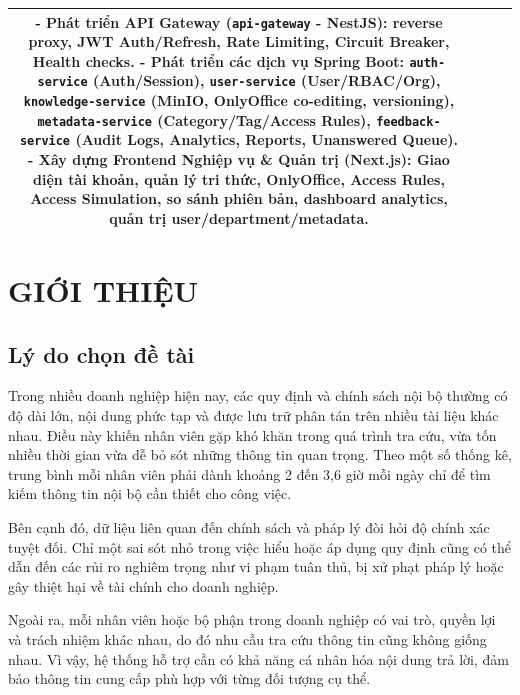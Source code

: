 \documentclass[12pt,a4paper]{report}
\begin{document}
\begin{table}[H]
\begin{tabularx}{\textwidth}{|c|l|l|X|}
- Phát triển API Gateway (\texttt{api-gateway} - NestJS): reverse proxy, JWT Auth/Refresh, Rate Limiting, Circuit Breaker, Health checks. \newline
- Phát triển các dịch vụ Spring Boot: \texttt{auth-service} (Auth/Session), \texttt{user-service} (User/RBAC/Org), \texttt{knowledge-service} (MinIO, OnlyOffice co-editing, versioning), \texttt{metadata-service} (Category/Tag/Access Rules), \texttt{feedback-service} (Audit Logs, Analytics, Reports, Unanswered Queue). \newline
- Xây dựng Frontend Nghiệp vụ \& Quản trị (Next.js): Giao diện tài khoản, quản lý tri thức, OnlyOffice, Access Rules, Access Simulation, so sánh phiên bản, dashboard analytics, quản trị user/department/metadata.
\\ \hline
\end{tabularx}
\end{table}

\clearpage

\chapter{GIỚI THIỆU}

\section{Lý do chọn đề tài}
Trong nhiều doanh nghiệp hiện nay, các quy định và chính sách nội bộ thường có độ dài lớn, nội dung phức tạp và được lưu trữ phân tán trên nhiều tài liệu khác nhau. Điều này khiến nhân viên gặp khó khăn trong quá trình tra cứu, vừa tốn nhiều thời gian vừa dễ bỏ sót những thông tin quan trọng. Theo một số thống kê, trung bình mỗi nhân viên phải dành khoảng 2 đến 3,6 giờ mỗi ngày chỉ để tìm kiếm thông tin nội bộ cần thiết cho công việc.

Bên cạnh đó, dữ liệu liên quan đến chính sách và pháp lý đòi hỏi độ chính xác tuyệt đối. Chỉ một sai sót nhỏ trong việc hiểu hoặc áp dụng quy định cũng có thể dẫn đến các rủi ro nghiêm trọng như vi phạm tuân thủ, bị xử phạt pháp lý hoặc gây thiệt hại về tài chính cho doanh nghiệp.

Ngoài ra, mỗi nhân viên hoặc bộ phận trong doanh nghiệp có vai trò, quyền lợi và trách nhiệm khác nhau, do đó nhu cầu tra cứu thông tin cũng không giống nhau. Vì vậy, hệ thống hỗ trợ cần có khả năng cá nhân hóa nội dung trả lời, đảm bảo thông tin cung cấp phù hợp với từng đối tượng cụ thể.
\end{document}
